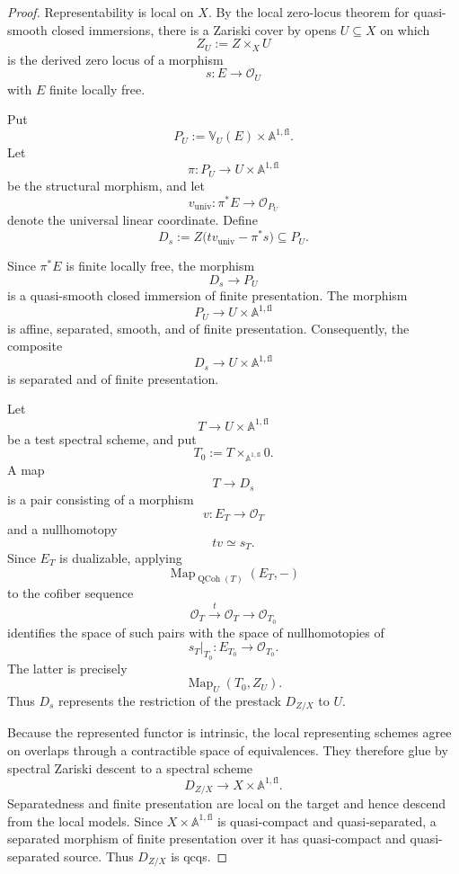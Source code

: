\begin{proof}
Representability is local on \(X\).  By the local zero-locus theorem for
quasi-smooth closed immersions, there is a Zariski cover by opens
\(U\subseteq X\) on which
\[
    Z_U:=Z\times_XU
\]
is the derived zero locus of a morphism
\[
    s:E\longrightarrow\mathcal O_U
\]
with \(E\) finite locally free.

Put
\[
    P_U
    :=
    \mathbb V_U(E)\times\mathbb A^{1,\mathrm{fl}}.
\]
Let
\[
    \pi:P_U\longrightarrow U\times\mathbb A^{1,\mathrm{fl}}
\]
be the structural morphism, and let
\[
    v_{\mathrm{univ}}:
    \pi^*E\longrightarrow\mathcal O_{P_U}
\]
denote the universal linear coordinate.  Define
\[
    D_s
    :=
    Z
    \bigl(
      t v_{\mathrm{univ}}-\pi^*s
    \bigr)
    \subseteq
    P_U.
\]

Since \(\pi^*E\) is finite locally free, the morphism
\[
    D_s\longrightarrow P_U
\]
is a quasi-smooth closed immersion of finite presentation.  The morphism
\[
    P_U\longrightarrow U\times\mathbb A^{1,\mathrm{fl}}
\]
is affine, separated, smooth, and of finite presentation.  Consequently,
the composite
\[
    D_s\longrightarrow U\times\mathbb A^{1,\mathrm{fl}}
\]
is separated and of finite presentation.

Let
\[
    T\longrightarrow U\times\mathbb A^{1,\mathrm{fl}}
\]
be a test spectral scheme, and put
\[
    T_0
    :=
    T\times_{\mathbb A^{1,\mathrm{fl}}}0.
\]
A map
\[
    T\longrightarrow D_s
\]
is a pair consisting of a morphism
\[
    v:E_T\longrightarrow\mathcal O_T
\]
and a nullhomotopy
\[
    tv\simeq s_T.
\]
Since \(E_T\) is dualizable, applying
\[
    \operatorname{Map}_{\operatorname{QCoh}(T)}(E_T,-)
\]
to the cofiber sequence
\[
    \mathcal O_T
    \xrightarrow{t}
    \mathcal O_T
    \longrightarrow
    \mathcal O_{T_0}
\]
identifies the space of such pairs with the space of nullhomotopies of
\[
    s_T|_{T_0}:
    E_{T_0}\longrightarrow\mathcal O_{T_0}.
\]
The latter is precisely
\[
    \operatorname{Map}_U(T_0,Z_U).
\]
Thus \(D_s\) represents the restriction of the prestack
\(D_{Z/X}\) to \(U\).

Because the represented functor is intrinsic, the local representing
schemes agree on overlaps through a contractible space of equivalences.
They therefore glue by spectral Zariski descent to a spectral scheme
\[
    D_{Z/X}
    \longrightarrow
    X\times\mathbb A^{1,\mathrm{fl}}.
\]
Separatedness and finite presentation are local on the target and hence
descend from the local models.  Since
\(X\times\mathbb A^{1,\mathrm{fl}}\) is quasi-compact and
quasi-separated, a separated morphism of finite presentation over it has
quasi-compact and quasi-separated source.  Thus \(D_{Z/X}\) is qcqs.


\end{proof}
